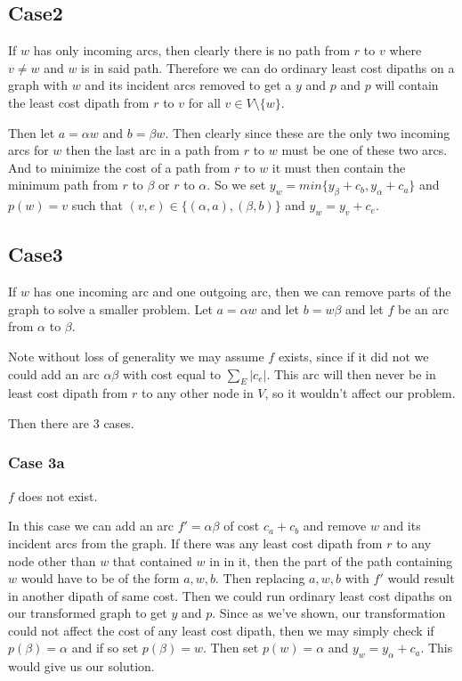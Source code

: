 \documentclass{article}
\begin{document}
\subsection*{Case2}
If $w$ has only incoming arcs, then clearly there is no path from $r$ to $v$ where $v \neq w$ and $w$ is in said path. Therefore we can do ordinary least cost dipaths on a graph with $w$ and its incident arcs removed to get a $y$ and $p$ and $p$ will contain the least cost dipath from $r$ to $v$ for all $v \in V \setminus \{w\}$.

Then let $a = \alpha w$ and $b = \beta w$. Then clearly since these are the only two incoming arcs for $w$ then the last arc in a path from $r$ to $w$ must be one of these two arcs. And to minimize the cost of a path from $r$ to $w$ it must then contain the minimum path from $r$ to $\beta$ or $r$ to $\alpha$. So we set $y_w = min \{ y_\beta + c_b, y_\alpha + c_a\} $ and
$p(w) = v$ such that $(v,e) \in \{(\alpha,a), (\beta,b)\}$ and $y_w = y_v + c_e$.

\subsection*{Case3}
If $w$ has one incoming arc and one outgoing arc, then we can remove parts of the graph to solve a smaller problem. Let $a = \alpha w$ and let $b = w \beta$ and let $f$ be an arc from $\alpha$ to $\beta$. 



Note without loss of generality we may assume $f$ exists, since if it did not we could add an arc $\alpha \beta$ with cost equal to $\sum_{E} |c_e|$. This arc will then never be in least cost dipath from $r$ to any other node in $V$, so it wouldn't affect our problem.

Then there are 3 cases.

\subsubsection*{Case 3a}
$f$ does not exist. 

In this case we can add an arc $f'=\alpha \beta$ of cost $c_a + c_b$ and remove $w$ and its incident arcs from the graph. If there was any least cost dipath from $r$ to any node other than $w$ that contained $w$ in in it, then the part of the path containing $w$ would have to be of the form $a, w, b$. Then replacing $a, w, b$ with $f'$ would result in another dipath of same cost. Then we could run ordinary least cost dipaths on our transformed graph to get $y$ and $p$. Since as we've shown, our transformation could not affect the cost of any least cost dipath, then we may simply check if $p(\beta) = \alpha$ and if so set $p(\beta) = w$. Then set $p(w) = \alpha$ and $y_w = y_\alpha + c_a$. This would give us our solution.
\end{document}
